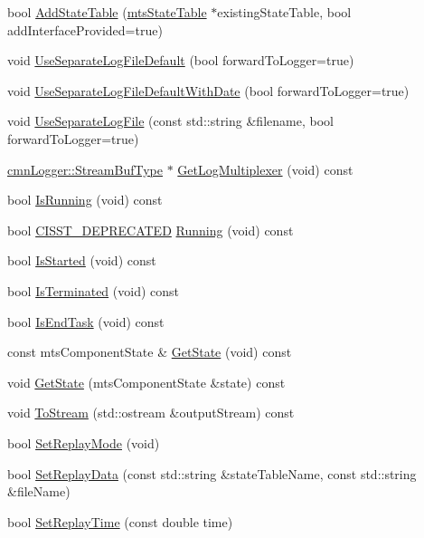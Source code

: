 \begin{DoxyCompactItemize}
\item 
bool \hyperlink{classmts_component_a5aac2a946a339738a9475772f71c9e0e}{Add\+State\+Table} (\hyperlink{classmts_state_table}{mts\+State\+Table} $\ast$existing\+State\+Table, bool add\+Interface\+Provided=true)
\item 
void \hyperlink{classmts_component_ab5b591dab8bacf138f972ec61d1f6d8e}{Use\+Separate\+Log\+File\+Default} (bool forward\+To\+Logger=true)
\item 
void \hyperlink{classmts_component_ae3b69d39e570c8465cb105b95ed59c65}{Use\+Separate\+Log\+File\+Default\+With\+Date} (bool forward\+To\+Logger=true)
\item 
void \hyperlink{classmts_component_a0dd9bd8b7fcd7d7e09871d0ace126699}{Use\+Separate\+Log\+File} (const std\+::string \&filename, bool forward\+To\+Logger=true)
\item 
\hyperlink{classcmn_logger_a7d192777882d1dc6bb48ceac0b4e65bb}{cmn\+Logger\+::\+Stream\+Buf\+Type} $\ast$ \hyperlink{classmts_component_a368c7115c8d9533d634077b2d76af18b}{Get\+Log\+Multiplexer} (void) const 
\item 
bool \hyperlink{classmts_component_ac6f03b0bddadb0bf316e4c62726c3928}{Is\+Running} (void) const 
\item 
bool \hyperlink{cmn_portability_8h_a63da7164735f9501be651b1f2bbc0121}{C\+I\+S\+S\+T\+\_\+\+D\+E\+P\+R\+E\+C\+A\+T\+E\+D} \hyperlink{classmts_component_a70c67f9502b7779ca6121a9b31034088}{Running} (void) const 
\item 
bool \hyperlink{classmts_component_a63a779dbed36bae9490a885a66abb14d}{Is\+Started} (void) const 
\item 
bool \hyperlink{classmts_component_afee031d17dd144505bdb2400c20c787f}{Is\+Terminated} (void) const 
\item 
bool \hyperlink{classmts_component_a9ea79bb1ef93b96f9caab0dd382fcd16}{Is\+End\+Task} (void) const 
\item 
const mts\+Component\+State \& \hyperlink{classmts_component_accc6e7dd1a32c10a4d3235f261b5fdcc}{Get\+State} (void) const 
\item 
void \hyperlink{classmts_component_a3a1956b97486a0ee89cc86c73004c9ce}{Get\+State} (mts\+Component\+State \&state) const 
\item 
void \hyperlink{classmts_component_aa654d2a0e1d1a9298ef2c8e5d69514df}{To\+Stream} (std\+::ostream \&output\+Stream) const 
\item 
bool \hyperlink{classmts_component_a13d754f15ab268dbbbe433780a635c1a}{Set\+Replay\+Mode} (void)
\item 
bool \hyperlink{classmts_component_a9837f59982f800aeacc8639c33533fc5}{Set\+Replay\+Data} (const std\+::string \&state\+Table\+Name, const std\+::string \&file\+Name)
\item 
bool \hyperlink{classmts_component_aef1ef1a98f5b97b7c8ffdf56adc48ab3}{Set\+Replay\+Time} (const double time)
\end{DoxyCompactItemize}
